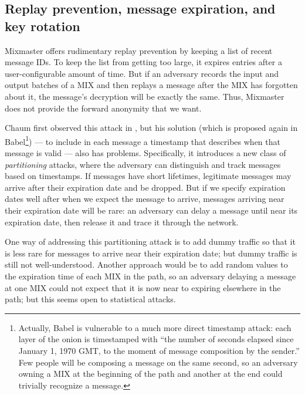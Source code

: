 \documentclass{llncs}
\begin{document}
\subsection{Replay prevention, message expiration, and key rotation}

Mixmaster offers rudimentary replay prevention by keeping a list of recent
message IDs. To keep the list from getting too large, it expires entries
after a user-configurable amount of time. But if an adversary records
the input and output batches of a MIX and then replays a message after
the MIX has forgotten about it, the message's decryption will be exactly
the same. Thus, Mixmaster does not provide the forward anonymity that we want.

Chaum first observed this attack in \cite{chaum-mix},
but his solution (which is proposed again in Babel\footnote{
  Actually, Babel is vulnerable to a much more direct timestamp attack:
  each layer of the onion is timestamped with ``the number of seconds
  elapsed since January 1, 1970 GMT, to the moment of message composition
  by the sender.'' Few people will be composing a message on the same
  second, so an adversary owning a MIX at the beginning of the path and
  another at the end could trivially recognize a message.
}) --- to include in each message a timestamp that describes when that message
is valid --- also has problems. Specifically, it introduces a new class
of \emph{partitioning} attacks, where the adversary can distinguish and
track messages based on timestamps. If messages have short lifetimes,
legitimate messages may arrive after their expiration date and be
dropped. But if we specify expiration dates well after when we expect the
message to arrive, messages arriving near their expiration date will be
rare: an adversary can delay a message until near its expiration date,
then release it and trace it through the network.


One way of addressing this partitioning attack is to add dummy traffic
so that it is less rare for messages to arrive near their expiration date;
but dummy traffic is still not well-understood. Another approach would
be to add random values to the expiration time of each MIX in the path,
so an adversary delaying a message at one MIX could not expect that it
is now near to expiring elsewhere in the path; but this seems open to
statistical attacks.

\end{document}
